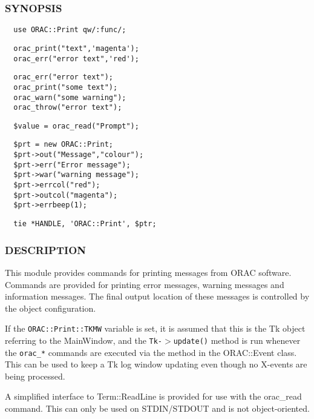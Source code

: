 \begin{description}
\subsubsection*{SYNOPSIS\label{ORAC::Print_SYNOPSIS}}
\begin{verbatim}
  use ORAC::Print qw/:func/;
\end{verbatim}
\begin{verbatim}
  orac_print("text",'magenta');
  orac_err("error text",'red');
\end{verbatim}
\begin{verbatim}
  orac_err("error text");
  orac_print("some text");
  orac_warn("some warning");
  orac_throw("error text");
\end{verbatim}
\begin{verbatim}
  $value = orac_read("Prompt");
\end{verbatim}
\begin{verbatim}
  $prt = new ORAC::Print;
  $prt->out("Message","colour");
  $prt->err("Error message");
  $prt->war("warning message");
  $prt->errcol("red");
  $prt->outcol("magenta");
  $prt->errbeep(1);
\end{verbatim}
\begin{verbatim}
  tie *HANDLE, 'ORAC::Print', $ptr;
\end{verbatim}
\subsubsection*{DESCRIPTION\label{ORAC::Print_DESCRIPTION}}


This module provides commands for printing messages from ORAC
software. Commands are provided for printing error messages, warning
messages and information messages. The final output location of these
messages is controlled by the object configuration.



If the \texttt{ORAC::Print::TKMW} variable is set, it is assumed that this
is the Tk object referring to the MainWindow, and the
\texttt{Tk-$>$update()} method is run whenever the \texttt{orac\_*} commands are
executed via the method in the ORAC::Event class.  This can be used to
keep a Tk log window updating even though no X-events are being processed.



A simplified interface to Term::ReadLine is provided for use with
the orac\_read command. This can only be used on STDIN/STDOUT and
is not object-oriented.


\end{description}
